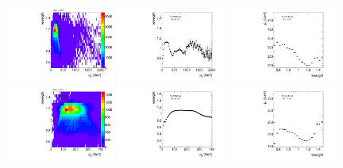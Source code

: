 \begin{figure}[htbp!]
\begin{center}
\includegraphics[angle=270, width=0.32\textwidth]{./figures/boosted/AppendixReweight/Weights/2Trk_split_Sideband_leadHCand_trk0_Pt_weight.pdf}
\includegraphics[angle=270, width=0.32\textwidth]{./figures/boosted/AppendixReweight/Weights/2Trk_split_Sideband_leadHCand_trk0_Pt_weight_profx.pdf}
\includegraphics[angle=270, width=0.32\textwidth]{./figures/boosted/AppendixReweight/Weights/2Trk_split_Sideband_leadHCand_trk0_Pt_weight_profy.pdf}\\
\includegraphics[angle=270, width=0.32\textwidth]{./figures/boosted/AppendixReweight/Weights/2Trk_split_Sideband_sublHCand_trk0_Pt_weight.pdf}
\includegraphics[angle=270, width=0.32\textwidth]{./figures/boosted/AppendixReweight/Weights/2Trk_split_Sideband_sublHCand_trk0_Pt_weight_profx.pdf}
\includegraphics[angle=270, width=0.32\textwidth]{./figures/boosted/AppendixReweight/Weights/2Trk_split_Sideband_sublHCand_trk0_Pt_weight_profy.pdf}\\

\end{center}
\end{figure}

